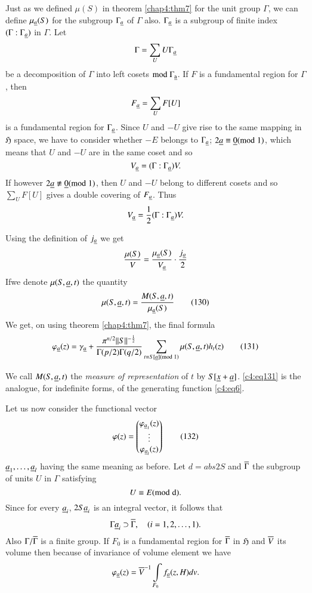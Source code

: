 Just as we defined $\mu(S)$ in theorem \ref{chap4:thm7} for the unit group
$\Gamma$, we can define $\mu_{\underline{a}}(S)$ for the subgroup
$\Gamma_{\underline{a}}$ of $\Gamma$ also. $\Gamma_{\underline{a}}$ is a subgroup of
finite index $(\Gamma:\Gamma_{\underline{a}})$ in $\Gamma$. Let
$$
\Gamma=\sum_{U}U\Gamma_{\underline{a}}
$$
be a decomposition of $\Gamma$ into left cosets $\rm{mod} \;
\Gamma_{\underline{a}}$. If $F$ is a fundamental region for $\Gamma$, then
$$
F_{\underline{a}}=\sum_{U}F[U]
$$
is a fundamental region for $\Gamma_{\underline{a}}$. Since $U$ and $-U$
give rise to the same mapping in $\mathfrak{H}$ space, we have to
consider whether $-E$ belongs to $\Gamma_{\underline{a}}$; \iec
$2\underline{a}\equiv\underline{0}(\rm{mod} \; 1)$, which means that $U$ and $-U$ are in
the same coset and so
$$
V_{\underline{a}} = (\Gamma:\Gamma_{\underline{a}})V.
$$
If however $2\underline{a}\not\equiv \underline{0}(\rm{mod} \; 1)$, then $U$ and $-U$
belong to different cosets and so $\sum\limits_{U}F[U]$ gives a double
covering of $F_{\underline{a}}$. Thus
$$
V_{\underline{a}}=\frac{1}{2}(\Gamma:\Gamma_{\underline{a}})V.
$$

Using the definition of $j_{\underline{a}}$ we get
$$
\frac{\mu(S)}{V}=\frac{\mu_{\underline{a}}(S)}{V_{\underline{a}}}\cdot
\frac{j_{\underline{a}}}{2}
$$
If\pageoriginale we denote $\mu(S,\underline{a},t)$ the quantity
\begin{equation*}
\mu(S,\underline{a},t)=\frac{M(S,\underline{a},t)}{\mu_{\underline{a}}(S)}\tag{130}\label{c4:eq130}
\end{equation*}
We get, on using theorem \ref{chap4:thm7}, the final formula
\begin{equation*}
\varphi_{\underline{a}}(z)=\gamma_{\underline{a}}+\frac{\pi^{n/2}||S||^{-\frac{1}{2}}}{\Gamma(p/2)\Gamma(q/2)}\sum_{t\equiv
  S[\underline{a}](\rm{mod} \; 1)}\mu(S,\underline{a},t)h_{t}(z)\tag{131}\label{c4:eq131} 
\end{equation*}

We call $M(S,\underline{a},t)$ the {\em measure of representation} of $t$ by
$S[\underline{x}+\underline{a}]$. \eqref{c4:eq131} is the analogue, for indefinite forms,
of the generating function \eqref{c4:eq6}.

Let us now consider the functional vector
\begin{equation*}
\varphi(z)=
\begin{pmatrix}
\varphi_{\underline{a}_{1}}(z)\\
\vdots\\
\varphi_{\underline{a}_{l}}(z)
\end{pmatrix}\tag{132}\label{c4:eq132}
\end{equation*}
$\underline{a}_{1},\ldots,\underline{a}_{l}$ having the same meaning as before. Let
$d=abs 2S$ and $\overline{\Gamma}$ the subgroup of units $U$ in $\Gamma$
satisfying 
$$
U\equiv E (\rm{mod} \; d).
$$
Since for every $\underline{a}_{i}$, $2S\underline{a}_{i}$ is an integral vector, it
follows that
$$
\Gamma\underline{a}_{i}\supset \overline{\Gamma},\quad (i=1,2,\ldots,1).
$$
Also $\Gamma/\overline{\Gamma}$ is a finite group. If $F_{0}$ is a
fundamental region for $\overline{\Gamma}$ in $\mathfrak{H}$ and $\overline{V}$
its volume then because of invariance of volume element we have 
$$
\varphi_{\underline{a}}(z)=\overline{V}^{-1}\int\limits_{F_{0}}f_{\underline{a}}(z,H)dv.
$$

